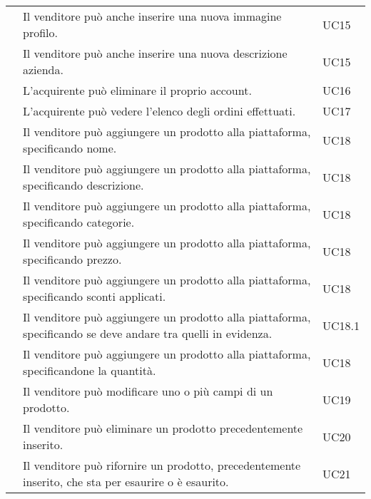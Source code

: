 \begin{longtable}{|c C{9.5cm} C{2.5cm}|}
     & Il venditore può anche inserire una nuova immagine profilo. & UC15 \\
    
     & Il venditore può anche inserire una nuova descrizione azienda. & UC15 \\
    
     & L'acquirente può eliminare il proprio account. & UC16 \\
    
     & L'acquirente può vedere l'elenco degli ordini effettuati. & UC17 \\
    
     & Il venditore può aggiungere un prodotto alla piattaforma, specificando nome. & UC18 \\
    
     & Il venditore può aggiungere un prodotto alla piattaforma, specificando descrizione. & UC18 \\
    
     & Il venditore può aggiungere un prodotto alla piattaforma, specificando categorie. & UC18 \\
    
     & Il venditore può aggiungere un prodotto alla piattaforma, specificando prezzo. & UC18 \\
    
     & Il venditore può aggiungere un prodotto alla piattaforma, specificando sconti applicati. & UC18 \\
    
     & Il venditore può aggiungere un prodotto alla piattaforma, specificando se deve andare tra quelli in evidenza. & UC18.1 \\
    
     & Il venditore può aggiungere un prodotto alla piattaforma, specificandone la quantità. & UC18 \\
    
     & Il venditore può modificare uno o più campi di un prodotto. & UC19 \\
    
     & Il venditore può eliminare un prodotto precedentemente inserito. & UC20 \\
    
     & Il venditore può rifornire un prodotto, precedentemente inserito, che sta per esaurire o è esaurito. & UC21 \\
    

\end{longtable}
